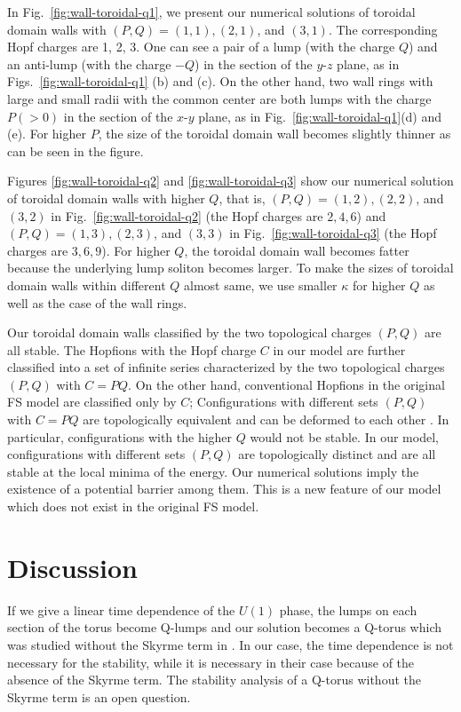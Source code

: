 \documentclass[aps,prd,preprint,
superscriptaddress]{revtex4}
\newcommand {\1}[1]{\frac{1}{#1}}
\newcommand {\2}[1]{\frac{i}{#1}}
\begin{document}
In Fig.~\ref{fig:wall-toroidal-q1}, we present our numerical 
solutions of toroidal domain walls 
with $(P,Q) = (1,1), (2,1)$, and $(3,1)$.
The corresponding Hopf charges are 1, 2, 3.
One can see a pair of a lump (with the charge $Q$) and an anti-lump (with the charge $-Q$) 
in the section of the $y$-$z$ plane,  
as in Figs.~\ref{fig:wall-toroidal-q1} (b) and (c). 
On the other hand,  
 two wall rings with large and small radii 
with the common center are both lumps 
with the charge $P(>0)$ 
in the section of the $x$-$y$ plane,
as in  Fig.~\ref{fig:wall-toroidal-q1}(d) and (e).
For higher $P$, the size of the toroidal domain wall becomes slightly thinner as can be seen in the figure.

Figures \ref{fig:wall-toroidal-q2} and \ref{fig:wall-toroidal-q3} show our numerical solution of toroidal domain walls with higher $Q$, that is, $(P,Q) = (1,2), (2,2)$, and $(3,2)$ 
in Fig.~\ref{fig:wall-toroidal-q2} 
(the Hopf charges are $2,4,6$) and 
$(P,Q) = (1,3), (2,3)$, and $(3,3)$ in Fig.~\ref{fig:wall-toroidal-q3} (the Hopf charges are $3,6,9$). 
For higher $Q$, the toroidal domain wall becomes fatter because the underlying lump soliton becomes larger.
To make the sizes of toroidal domain walls within different $Q$ almost same, we use smaller $\kappa$ for higher $Q$ as well as the case of the wall rings.




Our toroidal domain walls classified 
by the two topological charges $(P,Q)$ are all stable. 
The Hopfions with the Hopf charge $C$ in our model are
further classified 
into a set of infinite series characterized by 
the two topological charges $(P,Q)$ with $C=PQ$.
On the other hand, conventional Hopfions in the original FS model are classified only by $C$; 
Configurations with different sets $(P,Q)$ with $C=PQ$ are topologically equivalent and can be deformed
to each other \cite{Hietarinta:2000ci}. 
In particular, configurations with the higher $Q$ 
would not be stable.
In our model, configurations with different 
sets $(P,Q)$ are topologically distinct and are all stable 
at the local minima of the energy.
Our numerical solutions imply 
the existence of a potential barrier among them. 
This is a new feature of our model 
which does not exist in the original FS model. 

\section{Discussion \label{sec:summary} }
If we give a linear time dependence of the $U(1)$ phase, 
the lumps on each section of the torus become Q-lumps \cite{Leese:1991hr} 
and our solution becomes a Q-torus 
which was studied without the Skyrme term in \cite{Bolognesi:2007zz}. 
In our case, the time dependence 
is not necessary for the stability, 
while it is necessary in their case because of 
the absence of the Skyrme term. 
The stability analysis of a Q-torus without the Skyrme term 
is an open question.  
\end{document}
